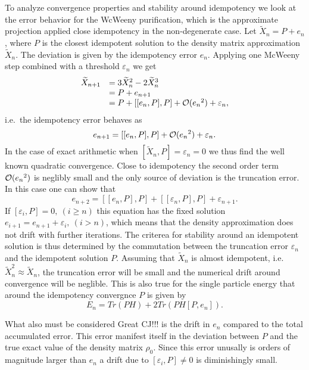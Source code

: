 To analyze convergence properties and stability around idempotency
we look at the error behavior for the WcWeeny purification,
which is the approximate projection applied close idempotency
in the non-degenerate case. Let ${ \widetilde X }_n = P + e_n$,
where $P$ is the closest idempotent solution to the density matrix
approximation ${ \widetilde X }_n$. The deviation is given by
the idempotency error $e_n$. Applying one McWeeny step 
combined with a threshold $\varepsilon_n$ we get
\begin{equation}
\begin{array}{ll}
{ \widetilde X }_{n+1} &= 3{ \widetilde X }_{n}^2-2{ \widetilde X }_{n}^3\\
&=P+e_{n+1} \\ & = P + \left[ [e_n,P],P\right] + {\cal O}({e_n}^2) + \varepsilon_n,
\end{array}
\end{equation}
i.e.\ the idempotency error behaves as
\begin{equation}
e_{n+1} =  \left[ [e_n,P],P\right] + {\cal O}({e_n}^2) + \varepsilon_n.
\end{equation}
In the case of exact arithmetic when $[{ \widetilde X }_n,P]= \varepsilon_n=0$
we thus find the well known quadratic convergence. Close to idempotency
the second order term ${\cal O}({e_n}^2)$ is neglibly small and the
only source of deviation is the truncation error. 
In this case one can show that
\begin{equation}
e_{n+2} =  \left[ [e_n,P],P\right] + \left[ [\varepsilon_n,P],P\right] + \varepsilon_{n+1}.
\end{equation}
If $[\varepsilon_i,P] = 0,~ (i \ge n)$ this equation 
has the fixed solution $e_{i+1} = e_{n+1} + \varepsilon_{i},~ (i > n)$, which means that the
density approximation does not drift with further iterations.
The criterea for stability around an idempotent solution is thus
determined by the commutation between the truncation error $\varepsilon_n$ and
the idempotent solution $P$. Assuming that ${ \widetilde X }_{n}$ is almost
idempotent, i.e. ${ \widetilde X }_{n}^2 \approx { \widetilde X }_{n}$,
the truncation error will be small and the numerical drift around
convergence will be neglible. This is also true for the single particle 
energy that around the idempotency convergnce $P$ is given by
\begin{equation}
E_n = Tr(PH) + 2Tr(PH[P,e_n]).
\end{equation}

What also must be considered {Great CJ!!!} is the drift in $e_n$ compared
to the total accumulated error. This error manifest itself in the
deviation between $P$ and the true exact value of the density matrix $\rho_0$.
Since this error unusally is orders of magnitude larger than $e_n$
a drift due to $[\varepsilon_i,P] \ne 0$ is diminishingly small.

